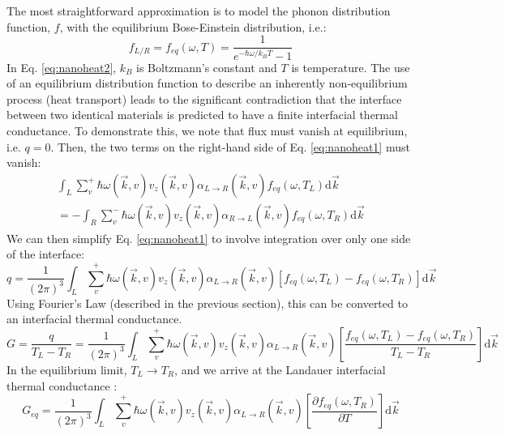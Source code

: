 The most straightforward approximation is to model the phonon distribution function, $f$, with the equilibrium Bose-Einstein distribution, i.e.:
\begin{equation}\label{eq:nanoheat2}
f_{L/R} = f_{eq}(\omega, T) = \frac{1}{e^{-\hbar\omega/k_BT} - 1}
\end{equation}
In Eq. \ref{eq:nanoheat2}, $k_B$ is Boltzmann's constant and $T$ is temperature. The use of an equilibrium distribution function to describe an inherently non-equilibrium process (heat transport) leads to the significant contradiction that the interface between two identical materials is predicted to have a finite interfacial thermal conductance. To demonstrate this, we note that flux must vanish at equilibrium, i.e. $q = 0$. Then, the two terms on the right-hand side of Eq. \ref{eq:nanoheat1} must vanish:
\begin{equation}\label{eq:nanoheat3}
\begin{split}
\int_L\sum_v^+ \hbar\omega(\vec{k},v)v_z(\vec{k}, v)\alpha_{L \rightarrow R}(\vec{k},v)f_{eq}(\omega, T_L)\mathrm{d}\vec{k} \\
= -\int_R\sum_v^- \hbar\omega(\vec{k},v)v_z(\vec{k}, v)\alpha_{R \rightarrow L}(\vec{k},v)f_{eq}(\omega, T_R)\mathrm{d}\vec{k}
\end{split}
\end{equation}
We can then simplify Eq. \ref{eq:nanoheat1} to involve integration over only one side of the interface:
\begin{equation}\label{eq:nanoheat4}
q = \frac{1}{\left(2\pi\right)^3}\int_L\sum_v^+ \hbar\omega(\vec{k},v)v_z(\vec{k}, v)\alpha_{L \rightarrow R}(\vec{k},v)\left[f_{eq}(\omega, T_L) - f_{eq}(\omega, T_R)\right]\mathrm{d}\vec{k}
\end{equation}
Using Fourier's Law (described in the previous section), this can be converted to an interfacial thermal conductance.
\begin{equation}\label{eq:nanoheat5}
G = \frac{q}{T_L - T_R} = \frac{1}{\left(2\pi\right)^3}\int_L\sum_v^+ \hbar\omega(\vec{k},v)v_z(\vec{k}, v)\alpha_{L \rightarrow R}(\vec{k},v)\left[\frac{f_{eq}(\omega, T_L) - f_{eq}(\omega, T_R)}{T_L - T_R}\right]\mathrm{d}\vec{k}
\end{equation}
In the equilibrium limit, $T_L \rightarrow T_R$, and we arrive at the Landauer interfacial thermal conductance \cite{landauer1970electrical}:
\begin{equation}\label{eq:nanoheat6}
G_{eq} = \frac{1}{\left(2\pi\right)^3}\int_L\sum_v^+ \hbar\omega(\vec{k},v)v_z(\vec{k}, v)\alpha_{L \rightarrow R}(\vec{k},v)\left[\frac{\partial f_{eq}\left(\omega, T_R\right)}{\partial T}\right]\mathrm{d}\vec{k}
\end{equation}
